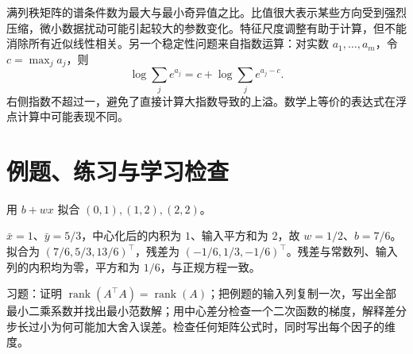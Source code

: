 满列秩矩阵的谱条件数为最大与最小奇异值之比。比值很大表示某些方向受到强烈压缩，微小数据扰动可能引起较大的参数变化。特征尺度调整有助于计算，但不能消除所有近似线性相关。另一个稳定性问题来自指数运算：对实数 $a_1,\ldots,a_m$，令 $c=\max_j a_j$，则
\[
 \log\sum_j e^{a_j}=c+\log\sum_j e^{a_j-c}.
\]
右侧指数不超过一，避免了直接计算大指数导致的上溢。数学上等价的表达式在浮点计算中可能表现不同。

\section{例题、练习与学习检查}

\begin{example}[投影求一条直线]
用 $b+wx$ 拟合 $(0,1),(1,2),(2,2)$。
\end{example}
\begin{solve}
$\bar x=1$、$\bar y=5/3$，中心化后的内积为 $1$、输入平方和为 $2$，故 $w=1/2$、$b=7/6$。拟合为 $(7/6,5/3,13/6)^\top$，残差为 $(-1/6,1/3,-1/6)^\top$。残差与常数列、输入列的内积均为零，平方和为 $1/6$，与正规方程一致。
\end{solve}

习题：证明 $\operatorname{rank}(A^\top A)=\operatorname{rank}(A)$；把例题的输入列复制一次，写出全部最小二乘系数并找出最小范数解；用中心差分检查一个二次函数的梯度，解释差分步长过小为何可能加大舍入误差。检查任何矩阵公式时，同时写出每个因子的维度。






